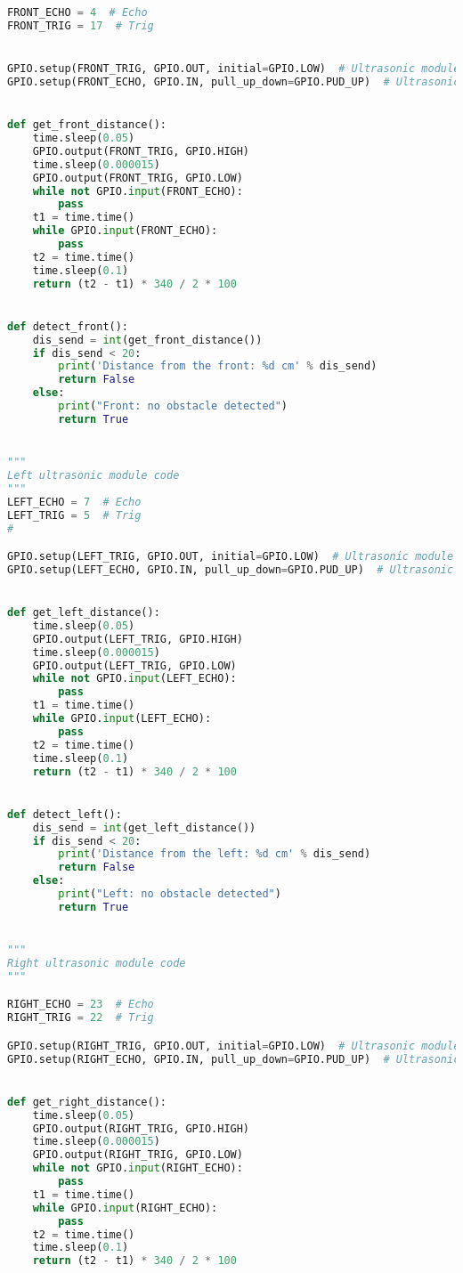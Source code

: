 \documentclass[11pt,times,oneside,openright,hardcopy]{eeereport}
\begin{document}
\begin{lstlisting}[language=Python]
FRONT_ECHO = 4  # Echo
FRONT_TRIG = 17  # Trig


GPIO.setup(FRONT_TRIG, GPIO.OUT, initial=GPIO.LOW)  # Ultrasonic module transmitter setting
GPIO.setup(FRONT_ECHO, GPIO.IN, pull_up_down=GPIO.PUD_UP)  # Ultrasonic module receiver setting


def get_front_distance():
    time.sleep(0.05)
    GPIO.output(FRONT_TRIG, GPIO.HIGH)
    time.sleep(0.000015)
    GPIO.output(FRONT_TRIG, GPIO.LOW)
    while not GPIO.input(FRONT_ECHO):
        pass
    t1 = time.time()
    while GPIO.input(FRONT_ECHO):
        pass
    t2 = time.time()
    time.sleep(0.1)
    return (t2 - t1) * 340 / 2 * 100


def detect_front():
    dis_send = int(get_front_distance())
    if dis_send < 20:
        print('Distance from the front: %d cm' % dis_send)
        return False
    else:
        print("Front: no obstacle detected")
        return True


"""
Left ultrasonic module code
"""
LEFT_ECHO = 7  # Echo
LEFT_TRIG = 5  # Trig
#

GPIO.setup(LEFT_TRIG, GPIO.OUT, initial=GPIO.LOW)  # Ultrasonic module transmitter setting
GPIO.setup(LEFT_ECHO, GPIO.IN, pull_up_down=GPIO.PUD_UP)  # Ultrasonic module receiver setting


def get_left_distance():
    time.sleep(0.05)
    GPIO.output(LEFT_TRIG, GPIO.HIGH)
    time.sleep(0.000015)
    GPIO.output(LEFT_TRIG, GPIO.LOW)
    while not GPIO.input(LEFT_ECHO):
        pass
    t1 = time.time()
    while GPIO.input(LEFT_ECHO):
        pass
    t2 = time.time()
    time.sleep(0.1)
    return (t2 - t1) * 340 / 2 * 100


def detect_left():
    dis_send = int(get_left_distance())
    if dis_send < 20:
        print('Distance from the left: %d cm' % dis_send)
        return False
    else:
        print("Left: no obstacle detected")
        return True


"""
Right ultrasonic module code
"""

RIGHT_ECHO = 23  # Echo
RIGHT_TRIG = 22  # Trig

GPIO.setup(RIGHT_TRIG, GPIO.OUT, initial=GPIO.LOW)  # Ultrasonic module transmitter setting
GPIO.setup(RIGHT_ECHO, GPIO.IN, pull_up_down=GPIO.PUD_UP)  # Ultrasonic module receiver setting


def get_right_distance():
    time.sleep(0.05)
    GPIO.output(RIGHT_TRIG, GPIO.HIGH)
    time.sleep(0.000015)
    GPIO.output(RIGHT_TRIG, GPIO.LOW)
    while not GPIO.input(RIGHT_ECHO):
        pass
    t1 = time.time()
    while GPIO.input(RIGHT_ECHO):
        pass
    t2 = time.time()
    time.sleep(0.1)
    return (t2 - t1) * 340 / 2 * 100



\end{lstlisting}
\end{document}
